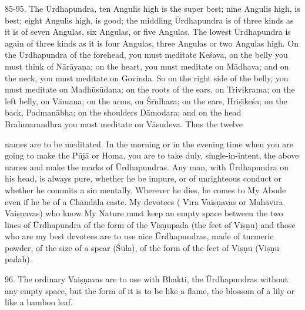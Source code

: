 85-95. The \=Urdhapundra, ten Angulis high is the super best; nine Angulis high, is best; eight Angulis high, is good; the middling \=Urdhapundra is of three kinds as it is of seven Angulas, six Angulas, or five Angulas. The lowest \=Urdhapundra is again of three kinds as it is four Angulas, three Angulas or two Angulas high. On the \=Urdhapundra of the forehead, you must meditate Ke\'sava, on the belly you must think of N\=ar\=aya\d{n}a; on the heart, you must meditate on M\=adhava; and on the neck, you must meditate on Govinda. So on the right side of the belly, you must meditate on Madh\=us\=udana; on the roots of the ears, on Trivikrama; on the left belly, on V\=amana; on the arms, on \'Sr\={\i}dhara; on the ears, Hri\d{s}\={\i}ke\'sa; on the back, Padman\=abha; on the shoulders D\=amodara; and on the head Brahmarandhra you must meditate on V\=asudeva. Thus the twelve

names are to be meditated. In the morning or in the evening time when you are going to make the P\=uj\=a or Homa, you are to take duly, single-in-intent, the above names and make the marks of \=Urdhapundras. Any man, with \=Urdhapundra on his head, is always pure, whether he be impure, or of unrighteous conduct or whether he commits a sin mentally. Wherever he dies, he comes to My Abode even if he be of a Ch\=and\=ala caste. My devotees ( V\={\i}ra Vai\d{s}\d{n}avas or Mah\=av\={\i}ra Vai\d{s}\d{n}avas) who know My Nature must keep an empty space between the two lines of \=Urdhapundra of the form of the Vi\d{s}\d{n}upada (the feet of Vi\d{s}\d{n}u) and those who are my best devotees are to use nice \=Urdhapundras, made of turmeric powder, of the size of a spear (\'S\=ula), of the form of the feet of Vi\d{s}\d{n}u (Vi\d{s}\d{n}u padah).

96. The ordinary Vai\d{s}\d{n}avas are to use with Bhakti, the \=Urdhapundras without any empty space, but the form of it is to be like a flame, the blossom of a lily or like a bamboo leaf.

